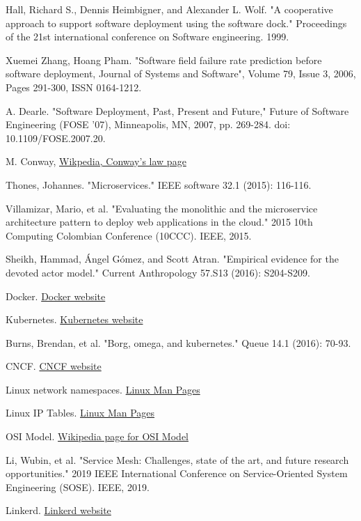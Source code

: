 \documentclass[conference]{IEEEtran}
\begin{document}
\begin{thebibliography}{00}

     Hall, Richard S., Dennis Heimbigner, and Alexander L. Wolf. "A cooperative approach to support software deployment using the software dock." Proceedings of the 21st international conference on Software engineering. 1999.

     Xuemei Zhang, Hoang Pham. "Software field failure rate prediction before software deployment, Journal of Systems and Software", Volume 79, Issue 3, 2006, Pages 291-300, ISSN 0164-1212.

     A. Dearle. "Software Deployment, Past, Present and Future," Future of Software Engineering (FOSE '07), Minneapolis, MN, 2007, pp. 269-284. doi: 10.1109/FOSE.2007.20.

     M. Conway, \href{https://en.wikipedia.org/wiki/Conway%27s_law}{Wikpedia, Conway's law page}

     Thones, Johannes. "Microservices." IEEE software 32.1 (2015): 116-116.

     Villamizar, Mario, et al. "Evaluating the monolithic and the microservice architecture pattern to deploy web applications in the cloud." 2015 10th Computing Colombian Conference (10CCC). IEEE, 2015.

     Sheikh, Hammad, Ángel Gómez, and Scott Atran. "Empirical evidence for the devoted actor model." Current Anthropology 57.S13 (2016): S204-S209.

     Docker. \href{https://www.docker.com}{Docker website}

     Kubernetes. \href{https://kubernetes.io}{Kubernetes website}

     Burns, Brendan, et al. "Borg, omega, and kubernetes." Queue 14.1 (2016): 70-93.

     CNCF. \href{https://www.cncf.io}{CNCF website}

     Linux network namespaces. \href{https://www.systutorials.com/docs/linux/man/7-network_namespaces/}{Linux Man Pages}

     Linux IP Tables. \href{https://www.systutorials.com/docs/linux/man/8-iptables/}{Linux Man Pages}

     OSI Model. \href{https://en.wikipedia.org/wiki/OSI_model}{Wikipedia page for OSI Model}

     Li, Wubin, et al. "Service Mesh: Challenges, state of the art, and future research opportunities." 2019 IEEE International Conference on Service-Oriented System Engineering (SOSE). IEEE, 2019.

     Linkerd. \href{https://linkerd.io}{Linkerd website}

\end{thebibliography}
\vspace{12pt}
\end{document}

